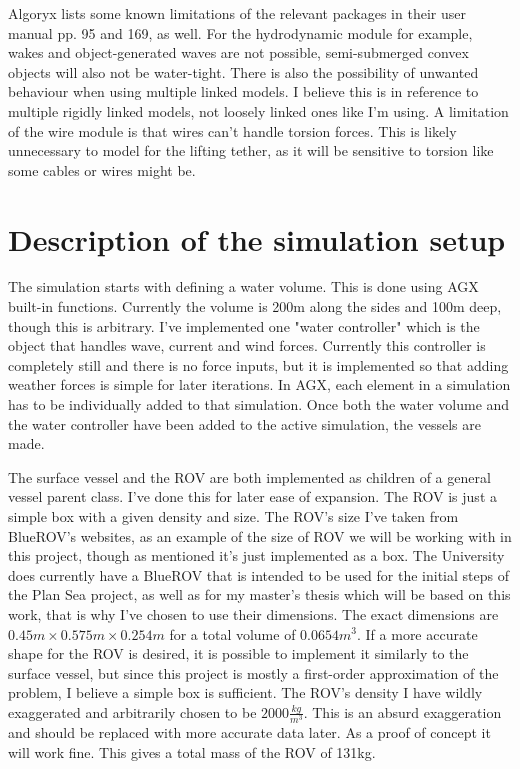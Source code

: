 Algoryx lists some known limitations of the relevant packages in their user manual\cite{algoryx_agx_nodate} pp. 95 and 169, as well. For the hydrodynamic module for example, wakes and object-generated waves are not possible, semi-submerged convex objects will also not be water-tight. There is also the possibility of unwanted behaviour when using multiple linked models. I believe this is in reference to multiple rigidly linked models, not loosely linked ones like I'm using. A limitation of the wire module is that wires can't handle torsion forces. This is likely unnecessary to model for the lifting tether, as it will be sensitive to torsion like some cables or wires might be.

\section{Description of the simulation setup}
The simulation starts with defining a water volume. This is done using AGX built-in functions. Currently the volume is 200m along the sides and 100m deep, though this is arbitrary. I've implemented one "water controller" which is the object that handles wave, current and wind forces. Currently this controller is completely still and there is no force inputs, but it is implemented so that adding weather forces is simple for later iterations. In AGX, each element in a simulation has to be individually added to that simulation. Once both the water volume and the water controller have been added to the active simulation, the vessels are made.

The surface vessel and the ROV are both implemented as children of a general vessel parent class. I've done this for later ease of expansion. The ROV is just a simple box with a given density and size. The ROV's size I've taken from BlueROV's websites\cite{noauthor_bluerov2_nodate}, as an example of the size of ROV we will be working with in this project, though as mentioned it's just implemented as a box. The University does currently have a BlueROV that is intended to be used for the initial steps of the Plan Sea project, as well as for my master's thesis which will be based on this work, that is why I've chosen to use their dimensions. The exact dimensions are \(0.45m \times 0.575m \times 0.254m\) for a total volume of \(0.0654m^3\). If a more accurate shape for the ROV is desired, it is possible to implement it similarly to the surface vessel, but since this project is mostly a first-order approximation of the problem, I believe a simple box is sufficient. The ROV's density I have wildly exaggerated and arbitrarily chosen to be \(2000\frac{kg}{m^3}\). This is an absurd exaggeration and should be replaced with more accurate data later. As a proof of concept it will work fine. This gives a total mass of the ROV of 131kg. 

